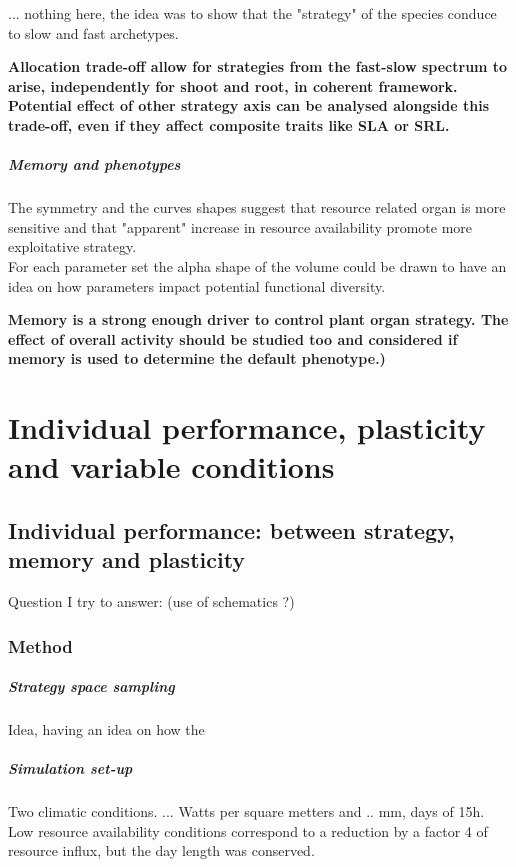 ... nothing here, the idea was to show that the "strategy" of the species conduce to slow and fast archetypes.

\textbf{Allocation trade-off allow for strategies from the fast-slow spectrum to arise, independently for shoot and root, in coherent framework. Potential effect of other strategy axis can be analysed alongside this trade-off, even if they affect composite traits like SLA or SRL.}

\paragraph{Memory and phenotypes}

 The symmetry and the curves shapes suggest that resource related organ is more sensitive and that "apparent" increase in resource availability promote more exploitative strategy.\\

For each parameter set the alpha shape of the volume could be drawn to have an idea on how parameters impact potential functional diversity.


\textbf{Memory is a strong enough driver to control plant organ strategy. The effect of overall activity should be studied too and considered if memory is used to determine the default phenotype.)}

\chapter{Individual performance, plasticity and variable conditions}
\section{Individual performance: between strategy, memory and plasticity}

Question I try to answer: (use of schematics ?)

\subsection{Method}

\paragraph{Strategy space sampling}
Idea, having an idea on how the 

\paragraph{Simulation set-up}
Two climatic conditions. ... Watts per square metters and .. mm, days of 15h. Low resource availability conditions correspond to a reduction by a factor 4 of resource influx, but the day length was conserved.

